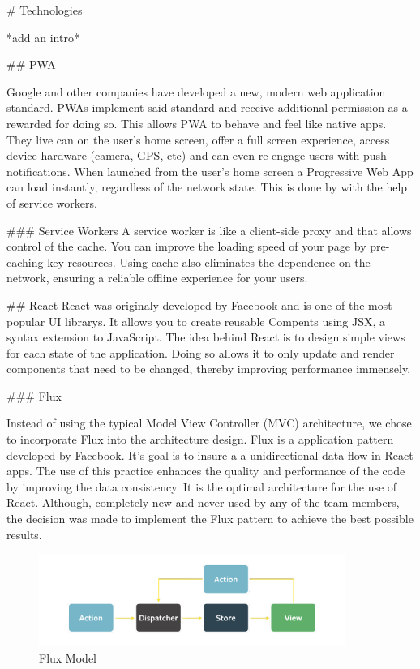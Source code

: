 \begin{markdown}
# Technologies

*add an intro*

## PWA
\cite{WhatIsPWA}

Google and other companies have developed a new, modern web application standard. PWAs implement said standard and receive additional permission as a rewarded for doing so. This allows PWA to behave and feel like native apps. They live can on the user's home screen, offer a full screen experience, access device hardware (camera, GPS, etc) and can even re-engage users with push notifications\cite{PWA}.  When launched from the user’s home screen a Progressive Web App can load instantly, regardless of the network state. This is done by with the help of service workers.

### Service Workers
A service worker is like a client-side proxy and that allows control of the cache. You can improve the loading speed of your page by pre-caching key resources. Using cache also eliminates the dependence on the network, ensuring a reliable offline experience for your users.\cite{ServiceWorker}

## React
React\cite{React} was originaly developed by Facebook and is one of the most popular UI librarys. It allows you to create reusable Compents using JSX, a syntax extension to JavaScript.
The idea behind React is to design simple views for each state of the application. Doing so allows it to only update and render components that need to be changed, thereby improving performance immensely.

### Flux

Instead of using the typical Model View Controller (MVC) architecture, we chose to incorporate Flux\cite{OurReadme} into the architecture design. Flux is a application pattern developed by Facebook. It's goal is to insure a a unidirectional data flow in React apps. The use of this practice enhances the quality and performance of the code by improving the data consistency. It is the optimal architecture for the use of React. Although, completely new and never used by any of the team members, the decision was made to implement the Flux pattern to achieve the best possible results.

\begin{figure}[H]
  \includegraphics[width=10cm, center]{./assets/flux.png}
  \caption{Flux Model{\cite{FluxModel}}}
\end{figure}




\end{markdown}
